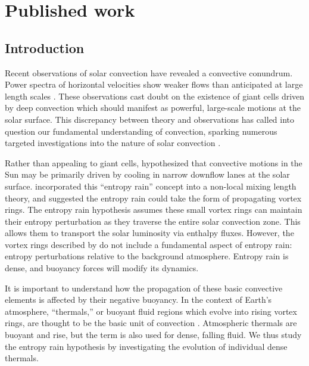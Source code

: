 \section{Published work}
\label{sec:alb19_published}

\subsection{Introduction}
\label{sec:intro}
Recent observations of solar convection have revealed a convective conundrum.
Power spectra of horizontal velocities show weaker flows than anticipated at large length scales \cite{hanasoge&all2012, greer&all2015}.
These observations cast doubt on the existence of giant cells driven by deep convection which should manifest as powerful, large-scale motions at the solar surface. 
This discrepancy between theory and observations has called into question our fundamental understanding of convection, sparking numerous targeted investigations into the nature of solar convection  \cite{featherstone&hindman2016a, omara&all2016, cossette&rast2016, kapyla&all2017, hotta2017}.

Rather than appealing to giant cells, \cite{spruit1997} hypothesized that convective motions in the Sun may be primarily driven by cooling in narrow downflow lanes at the solar surface.
\cite{brandenburg2016} incorporated this ``entropy rain'' concept into a non-local mixing length theory, and suggested the entropy rain could take the form of propagating vortex rings.
The entropy rain hypothesis assumes these small vortex rings can maintain their entropy perturbation as they traverse the entire solar convection zone.
This allows them to transport the solar luminosity via enthalpy fluxes.
However, the vortex rings described by \cite{brandenburg2016} do not include a fundamental aspect of entropy rain: entropy perturbations relative to the background atmosphere.
Entropy rain is dense, and buoyancy forces will modify its dynamics.

It is important to understand how the propagation of these basic convective elements is affected by their negative buoyancy. 
In the context of Earth's atmosphere, ``thermals,'' or buoyant fluid regions which evolve into rising vortex rings, are thought to be the basic unit of convection \cite[e.g.,][]{romps&all2015}. 
Atmospheric thermals are buoyant and rise, but the term is also used for dense, falling fluid.
We thus study the entropy rain hypothesis by investigating the evolution of individual dense thermals.

